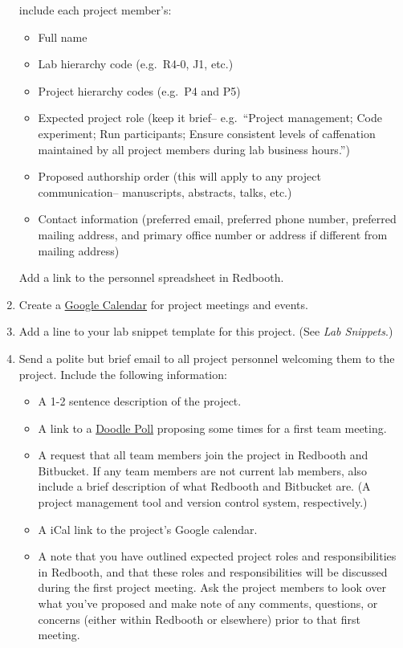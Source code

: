 \documentclass{tufte-book} %
\begin{document}
\begin{enumerate}
  include each project member's:
\begin{itemize}
\item Full name
\item Lab hierarchy code (e.g.\ R4-0, J1, etc.)
\item Project hierarchy codes (e.g.\ P4 and P5)
\item Expected project role (keep it brief-- e.g.\ ``Project management; Code
  experiment; Run participants; Ensure consistent levels of caffenation
  maintained by all project members during lab business hours.'')
\item Proposed authorship order (this will apply to any project communication-- manuscripts,
  abstracts, talks, etc.)
\item Contact information (preferred email, preferred phone number, preferred mailing address,
  and primary office number or address if different from mailing address)
\end{itemize}
Add a link to the personnel spreadsheet in Redbooth.
\item Create a \href{https://calendar.google.com}{Google Calendar} for
  project meetings and events.
\item Add a line to your lab snippet template for this project.  (See
  \textit{Lab Snippets}.)
\item Send a polite but brief email to all project personnel welcoming them to the
  project.  Include the following information:
\begin{itemize}
\item A 1-2 sentence description of the project.
\item A link to a \href{http://www.doodle.com}{Doodle
    Poll} proposing some times for a first team meeting.
\item A request that all team members join the project in Redbooth and
  Bitbucket.  If any team members are not current lab members, also
  include a brief description of what Redbooth and Bitbucket are.  (A
  project management tool and version control system, respectively.)
\item A iCal link to the project's Google calendar.
\item A note that you have outlined expected project roles and
  responsibilities in Redbooth, and that these roles and
  responsibilities will be discussed during the first project
  meeting.  Ask the project members to look over what you've proposed
  and make note of any comments, questions, or concerns (either within
  Redbooth or elsewhere) prior to that first meeting.
\end{itemize}
\end{enumerate}
\end{document}
